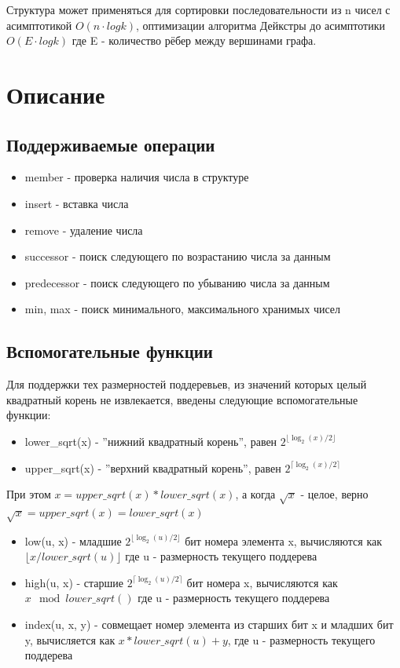 \documentclass{article}
\begin{document}
Структура может применяться для сортировки последовательности из n чисел с асимптотикой $O(n \cdot log{k})$, оптимизации алгоритма Дейкстры до асимптотики $O(E \cdot log{k})$ где E - количество рёбер между вершинами графа. \cite{ifmo}
\section{Описание}
\subsection{Поддерживаемые операции}
\begin{itemize}
    \item member - проверка наличия числа в структуре
    \item insert - вставка числа
    \item remove - удаление числа
    \item successor - поиск следующего по возрастанию числа за данным
    \item predecessor - поиск следующего по убыванию числа за данным
    \item min, max - поиск минимального, максимального хранимых чисел 
\end{itemize}
\subsection{Вспомогательные функции}
Для поддержки тех размерностей поддеревьев, из значений которых целый квадратный корень не извлекается, введены следующие вспомогательные функции:
\begin{itemize}
    \item lower\_sqrt(x) - ''нижний квадратный корень'', равен $2^{\lfloor\log_{2}(x)/2\rfloor}$
    \item upper\_sqrt(x) - ''верхний квадратный корень'', равен $2^{\lceil\log_{2}(x)/2\rceil}$
\end{itemize}
При этом $x = upper\_sqrt(x) * lower\_sqrt(x)$, а когда $\sqrt{x}$ - целое, верно $\sqrt{x} = upper\_sqrt(x) = lower\_sqrt(x)$
\begin{itemize}
    \item low(u, x) - младшие $2^{\lfloor\log_{2}(u)/2\rfloor}$ бит номера элемента x, вычисляются как $\lfloor{x/lower\_sqrt(u)}\rfloor$ где u - размерность текущего поддерева
    \item high(u, x) - старшие $2^{\lceil\log_{2}(u)/2\rceil}$ бит номера x, вычисляются как $x\mod{lower\_sqrt()}$  где u - размерность текущего поддерева
    \item index(u, x, y) - совмещает номер элемента из старших бит x и младших бит y, вычисляется как $x*lower\_sqrt(u) + y$, где u - размерность текущего поддерева
    
\end{itemize}
\cite{ita}
\end{document}
